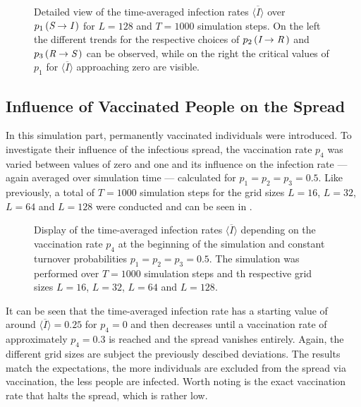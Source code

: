 \begin{figure}[ht]
    \centering
    \resizebox{\textwidth}{!}{}
    \caption{Detailed view of the time-averaged infection rates $\overline{\langle I\rangle}$ over $p_1\left(\textit{S}\rightarrow\textit{I}\,\right)$ for $L=128$ and $T=1000$ simulation steps. On the left the different
    trends for the respective choices of $p_2\left(\textit{I}\rightarrow\textit{R}\,\right)$ and $p_3\left(\textit{R}\rightarrow\textit{S}\,\right)$ can be observed, 
    while on the right the critical values of $p_1$ for $\overline{\langle I\rangle}$ approaching zero are visible.}\label{fig:res_dis_avg_inf_over_p1_L128}
\end{figure}


\subsection{Influence of Vaccinated People on the Spread}

In this simulation part, permanently vaccinated individuals \vaccinated{} were introduced. To investigate their influence of the infectious spread, the vaccination rate $p_4$ was varied between values of zero and one
and its influence on the infection rate --- again averaged over simulation time --- calculated for $p_1=p_2=p_3=0.5$. Like previously, a total of $T=1000$ simulation steps for the grid sizes 
$L=16$, $L=32$, $L=64$ and $L=128$ were conducted and can be seen in . 

\begin{figure}[ht]
    \centering
    \resizebox{\textwidth}{!}{}
    \caption{Display of the time-averaged infection rates $\overline{\langle I\rangle}$ depending on the vaccination rate $p_4$ at the beginning of the simulation and constant turnover probabilities
    $p_1=p_2=p_3=0.5$. The simulation was performed over $T=1000$ simulation steps and th respective grid sizes $L=16$, $L=32$, $L=64$ and $L=128$.}\label{fig:res_dis_avg_inf_over_p4}
\end{figure}

It can be seen that the time-averaged infection rate has a starting value of around $\overline{\langle I\rangle}=0.25$ for $p_4=0$ and then decreases until a vaccination rate of approximately $p_4=0.3$ is reached and
the spread vanishes entirely. Again, the different grid sizes are subject the previously descibed deviations. The results match the expectations, the more individuals are excluded from the spread via vaccination,
the less people are infected. Worth noting is the exact vaccination rate that halts the spread, which is rather low.


